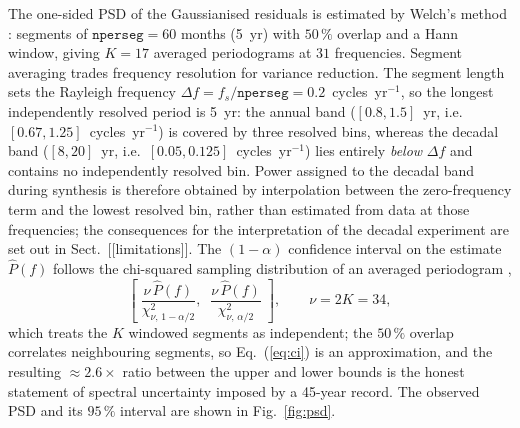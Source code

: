 The one-sided PSD of the Gaussianised residuals is estimated by Welch's
method \citep{welch1967}: segments of $\texttt{nperseg}=60$ months (5~yr)
with $50\,\%$ overlap and a Hann window, giving $K=17$ averaged
periodograms at $31$ frequencies. Segment averaging trades frequency
resolution for variance reduction. The segment length sets the Rayleigh
frequency $\Delta f = f_s/\texttt{nperseg} = 0.2$~cycles~yr$^{-1}$, so the
longest independently resolved period is 5~yr: the annual band
($[0.8,1.5]$~yr, i.e.\ $[0.67,1.25]$~cycles~yr$^{-1}$) is covered by three
resolved bins, whereas the decadal band ($[8,20]$~yr, i.e.\
$[0.05,0.125]$~cycles~yr$^{-1}$) lies entirely \emph{below} $\Delta f$ and
contains no independently resolved bin. Power assigned to the decadal band
during synthesis is therefore obtained by interpolation between the
zero-frequency term and the lowest resolved bin, rather than estimated from
data at those frequencies; the consequences for the interpretation of the
decadal experiment are set out in Sect.~[[limitations]]. The $(1-\alpha)$
confidence interval
on the estimate $\hat P(f)$ follows the chi-squared sampling distribution of
an averaged periodogram \citep{percival1993},
\begin{equation}\label{eq:ci}
  \left[\;
    \frac{\nu\,\hat P(f)}{\chi^2_{\nu,\,1-\alpha/2}},\;\;
    \frac{\nu\,\hat P(f)}{\chi^2_{\nu,\,\alpha/2}}
  \;\right],
  \qquad \nu = 2K = 34,
\end{equation}
which treats the $K$ windowed segments as independent; the $50\,\%$ overlap
correlates neighbouring segments, so Eq.~(\ref{eq:ci}) is an approximation,
and the resulting $\approx2.6\times$ ratio between the
upper and lower bounds is the honest statement of spectral uncertainty
imposed by a 45-year record. The observed PSD and its $95\,\%$ interval are
shown in Fig.~\ref{fig:psd}.

